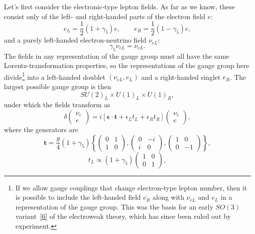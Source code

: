 Let's first consider the electronic-type lepton fields. As far as we know, these consist only of the left- and right-handed parts of the electron field $e$:
\begin{equation}
e_L=\frac{1}{2}(1+\gamma_5)e,
\qquad
e_R=\frac{1}{2}(1-\gamma_5)e,
\tag{21.3.1}\label{eq:21.3.1}
\end{equation}
and a purely left-handed electron-neutrino field $\nu_{eL}$:
\begin{equation}
\gamma_5\nu_{eL}=\nu_{eL}.
\tag{21.3.2}\label{eq:21.3.2}
\end{equation}
The fields in any representation of the gauge group must all have the same Lorentz-transformation properties, so the representations of the gauge group here divide\footnote{If we allow gauge couplings that change electron-type lepton number, then it is possible to include the left-handed field $\overline{e_R}$ along with $\nu_{eL}$ and $e_L$ in a representation of the gauge group. This was the basis for an early $SO(3)$ variant~\hyperref[ch21-ref-6]{[6]} of the electroweak theory, which has since been ruled out by experiment.} into a left-handed doublet $(\nu_{eL},e_L)$ and a right-handed singlet $e_R$. The largest possible gauge group is then
\[
SU(2)_L\times U(1)_L\times U(1)_R,
\]
under which the fields transform as
\begin{equation}
\delta
\begin{pmatrix}
\nu_e\\ e
\end{pmatrix}
=i\left[\boldsymbol{\epsilon}\cdot\mathbf{t}+\epsilon_Lt_L+\epsilon_Rt_R\right]
\begin{pmatrix}
\nu_e\\ e
\end{pmatrix},
\tag{21.3.3}\label{eq:21.3.3}
\end{equation}
where the generators are
\begin{equation}
\mathbf{t}
=\frac{g}{4}(1+\gamma_5)
\left\{
\begin{pmatrix}0&1\\1&0\end{pmatrix},
\begin{pmatrix}0&-i\\i&0\end{pmatrix},
\begin{pmatrix}1&0\\0&-1\end{pmatrix}
\right\},
\tag{21.3.4}\label{eq:21.3.4}
\end{equation}
\begin{equation}
t_L\propto(1+\gamma_5)
\begin{pmatrix}1&0\\0&1\end{pmatrix},
\tag{21.3.5}\label{eq:21.3.5}
\end{equation}
